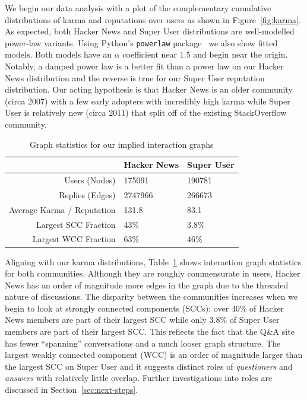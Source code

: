 \documentclass[10pt]{article}
\begin{document}
We begin our data analysis with a plot of the complementary cumulative
distributions of karma and reputations over users as shown in
Figure~\ref{fig:karma}. As expected, both Hacker News and Super User
distributions are well-modelled power-law variants. Using Python's
\texttt{powerlaw} package~\cite{alstott_powerlaw:_2013} we also show fitted
models. Both models have an $\alpha$ coefficient near 1.5 and begin near the
origin. Notably, a damped power law is a better fit than a power law on our
Hacker News distribution and the reverse is true for our Super User reputation
distribution.  Our acting hypothesis is that Hacker News is an older community
(circa 2007) with a few early adopters with incredibly high karma while Super
User is relatively new (circa 2011) that split off of the existing StackOverflow
community.

\begin{table}[H]
\begin{center}
\begin{tabular}{| r | l l |}
\hline
& \textbf{Hacker News} & \textbf{Super User} \\
\hline
Users (Nodes) & 175091 & 190781 \\
Replies (Edges) & 2747966 & 266673 \\
Average Karma / Reputation & 131.8 & 83.1 \\
Largest SCC Fraction & 43\% & 3.8\% \\
Largest WCC Fraction & 63\% & 46\% \\
\hline
\end{tabular}
\end{center}
\caption{Graph statistics for our implied interaction graphs}
\label{tab:graphstats}
\end{table}

Aligning with our karma distributions, Table~\ref{tab:graphstats} shows
interaction graph statistics for both communities. Although they are roughly
commensurate in users, Hacker News has an order of magnitude more edges in the
graph due to the threaded nature of discussions. The disparity between the
communities increases when we begin to look at strongly connected components
(SCCs): over 40\% of Hacker News members are part of their largest SCC while
only 3.8\% of Super User members are part of their largest SCC\@. This reflects
the fact that the Q\&A site has fewer ``spanning'' conversations and a much
looser graph structure. The largest weakly connected component (WCC) is an order
of magnitude larger than the largest SCC on Super User and it suggests 
distinct roles of \textit{questioners} and \textit{answers} with
relatively little overlap. Further investigations into roles are discussed
in Section~\ref{sec:next-steps}.
\end{document}
